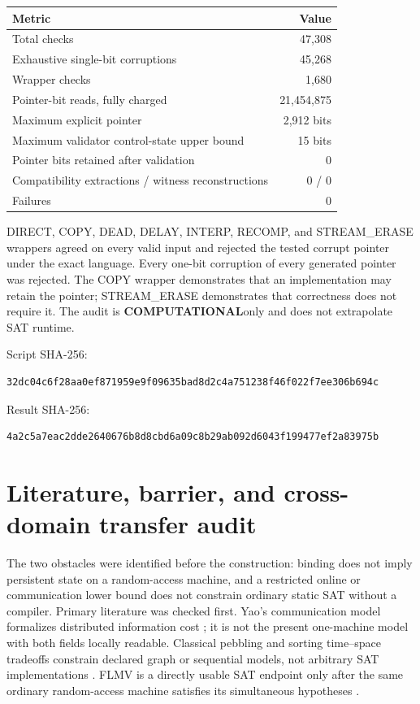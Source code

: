 \documentclass[11pt]{article}
\newcommand{\COMP}{\textbf{COMPUTATIONAL}}
\begin{document}
\begin{center}\small
\begin{tabular}{@{}lr@{}}
\toprule
Metric & Value\\ \midrule
Total checks & 47,308\\
Exhaustive single-bit corruptions & 45,268\\
Wrapper checks & 1,680\\
Pointer-bit reads, fully charged & 21,454,875\\
Maximum explicit pointer & 2,912 bits\\
Maximum validator control-state upper bound & 15 bits\\
Pointer bits retained after validation & 0\\
Compatibility extractions / witness reconstructions & 0 / 0\\
Failures & 0\\
\bottomrule
\end{tabular}
\end{center}

DIRECT, COPY, DEAD, DELAY, INTERP, RECOMP, and STREAM\_ERASE wrappers agreed
on every valid input and rejected the tested corrupt pointer under the exact
language.  Every one-bit corruption of every generated pointer was rejected.
The COPY wrapper demonstrates that an implementation may retain the pointer;
STREAM\_ERASE demonstrates that correctness does not require it.  The audit
is \COMP only and does not extrapolate SAT runtime.

Script SHA-256:
\begin{verbatim}
32dc04c6f28aa0ef871959e9f09635bad8d2c4a751238f46f022f7ee306b694c
\end{verbatim}
Result SHA-256:
\begin{verbatim}
4a2c5a7eac2dde2640676b8d8cbd6a09c8b29ab092d6043f199477ef2a83975b
\end{verbatim}

\section{Literature, barrier, and cross-domain transfer audit}

The two obstacles were identified before the construction: binding does not
imply persistent state on a random-access machine, and a restricted online or
communication lower bound does not constrain ordinary static SAT without a
compiler.  Primary literature was checked first.  Yao's communication model
formalizes distributed information cost \cite{Yao79}; it is not the present
one-machine model with both fields locally readable.  Classical pebbling and
sorting time--space tradeoffs constrain declared graph or sequential models,
not arbitrary SAT implementations \cite{Pippenger81,BorodinCook82}.  FLMV is
a directly usable SAT endpoint only after the same ordinary random-access
machine satisfies its simultaneous hypotheses \cite{FLMV05}.
\end{document}
